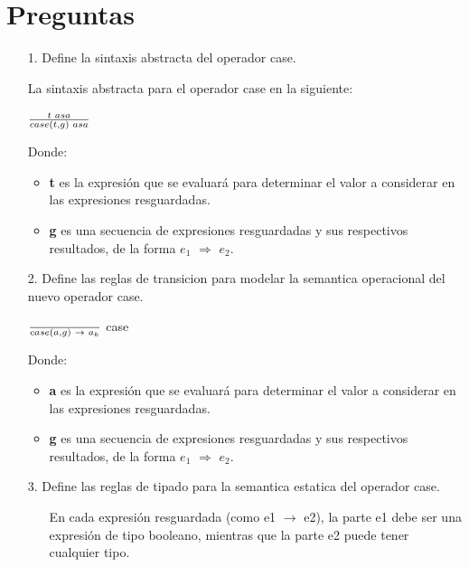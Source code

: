 \documentclass{article}
\begin{document}
    \section{Preguntas}
    \begin{itemize}
        \item[1.] Define la sintaxis abstracta del operador case.
        
        La sintaxis abstracta para el operador {\sf case} en la siguiente:
        \begin{center}
                \Large{$\frac{t\hspace{0.1cm}asa}{case(t,g)\hspace{0.1cm}asa}$}
            \end{center}
        Donde:
        \begin{itemize}
            \item \textbf{t} es la expresión que se evaluará para determinar el valor a considerar en las expresiones resguardadas.

            \item \textbf{g} es una secuencia de expresiones resguardadas y sus respectivos resultados, de la forma $e_1$ $\Rightarrow$ $e_2$.\\
        \end{itemize}
        
        \item[2.] Define las reglas de transicion para modelar la semantica operacional del nuevo operador case.
        \begin{center}
                {\Large{$\frac{}{case(a,g)\hspace{0.1cm}\rightarrow\hspace{0.1cm}a_k}$}}\hspace{0.2cm} case
            \end{center}
        Donde:
        \begin{itemize}
            \item \textbf{a}  es la expresión que se evaluará para determinar el valor a considerar en las expresiones resguardadas.

            \item \textbf{g} es una secuencia de expresiones resguardadas y sus respectivos resultados, de la forma $e_1$ $\Rightarrow$ $e_2$.\\
        \end{itemize}
        
        \item[3.] Define las reglas de tipado para la semantica estatica del operador case.
        \begin{itemize}
            \item[ ] En cada expresión resguardada (como e1 $\rightarrow$ e2), la parte e1 debe ser una expresión de tipo booleano, mientras que la parte e2 puede tener cualquier tipo.


\end{itemize}
\end{itemize}
\end{document}
